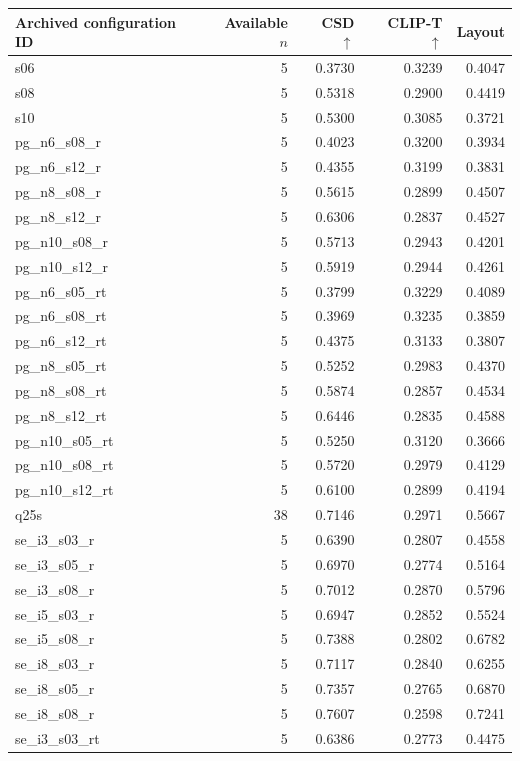 \begin{tabular}{lrrrr}
\toprule
Archived configuration ID & Available $n$ & CSD $\uparrow$ & CLIP-T $\uparrow$ & Layout \\
\midrule
s06 & 5 & 0.3730 & 0.3239 & 0.4047 \\
s08 & 5 & 0.5318 & 0.2900 & 0.4419 \\
s10 & 5 & 0.5300 & 0.3085 & 0.3721 \\
pg\_n6\_s08\_r & 5 & 0.4023 & 0.3200 & 0.3934 \\
pg\_n6\_s12\_r & 5 & 0.4355 & 0.3199 & 0.3831 \\
pg\_n8\_s08\_r & 5 & 0.5615 & 0.2899 & 0.4507 \\
pg\_n8\_s12\_r & 5 & 0.6306 & 0.2837 & 0.4527 \\
pg\_n10\_s08\_r & 5 & 0.5713 & 0.2943 & 0.4201 \\
pg\_n10\_s12\_r & 5 & 0.5919 & 0.2944 & 0.4261 \\
pg\_n6\_s05\_rt & 5 & 0.3799 & 0.3229 & 0.4089 \\
pg\_n6\_s08\_rt & 5 & 0.3969 & 0.3235 & 0.3859 \\
pg\_n6\_s12\_rt & 5 & 0.4375 & 0.3133 & 0.3807 \\
pg\_n8\_s05\_rt & 5 & 0.5252 & 0.2983 & 0.4370 \\
pg\_n8\_s08\_rt & 5 & 0.5874 & 0.2857 & 0.4534 \\
pg\_n8\_s12\_rt & 5 & 0.6446 & 0.2835 & 0.4588 \\
pg\_n10\_s05\_rt & 5 & 0.5250 & 0.3120 & 0.3666 \\
pg\_n10\_s08\_rt & 5 & 0.5720 & 0.2979 & 0.4129 \\
pg\_n10\_s12\_rt & 5 & 0.6100 & 0.2899 & 0.4194 \\
q25s & 38 & 0.7146 & 0.2971 & 0.5667 \\
se\_i3\_s03\_r & 5 & 0.6390 & 0.2807 & 0.4558 \\
se\_i3\_s05\_r & 5 & 0.6970 & 0.2774 & 0.5164 \\
se\_i3\_s08\_r & 5 & 0.7012 & 0.2870 & 0.5796 \\
se\_i5\_s03\_r & 5 & 0.6947 & 0.2852 & 0.5524 \\
se\_i5\_s08\_r & 5 & 0.7388 & 0.2802 & 0.6782 \\
se\_i8\_s03\_r & 5 & 0.7117 & 0.2840 & 0.6255 \\
se\_i8\_s05\_r & 5 & 0.7357 & 0.2765 & 0.6870 \\
se\_i8\_s08\_r & 5 & 0.7607 & 0.2598 & 0.7241 \\
se\_i3\_s03\_rt & 5 & 0.6386 & 0.2773 & 0.4475 \\

\end{tabular}
